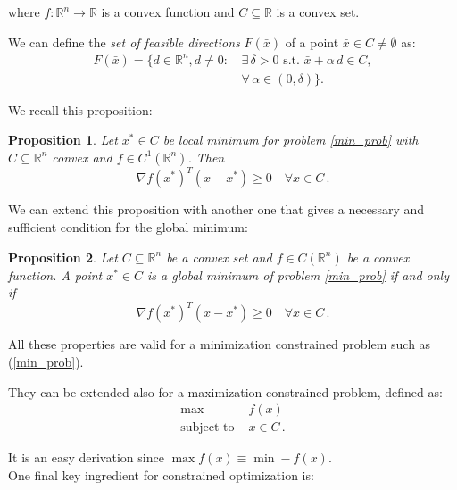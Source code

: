 \documentclass[10pt,twocolumn,letterpaper, english]{article}
\theoremstyle{definition}
\theoremstyle{plain}
\theoremstyle{plain}
\theoremstyle{plain}
\theoremstyle{plain}
\newtheorem{prop}{Proposition}[subsection]
\theoremstyle{remark}
\theoremstyle{remark}
\theoremstyle{definition}
\theoremstyle{definition}
\theoremstyle{definition}
\theoremstyle{definition}
\begin{document}
\noindent where $f: \mathbb{R}^n \to \mathbb{R}$ is a convex function and $C \subseteq \mathbb{R}$ is a convex set.

We can define the \textit{set of feasible directions} $F(\bar{x})$ of a point $\bar{x} \in C \ne \emptyset$ as: 
\begin{align}
    F(\bar{x}) = \{ d \in \mathbb{R}^n, d \ne 0:\, &\exists \, \delta > 0 \text{ s.t. } \bar{x} + \alpha\, d \in C, \\ &\forall\, \alpha \in (0, \delta) \} . \nonumber
\end{align}

\noindent We recall this proposition: 

\begin{prop}
 Let $x^* \in C$ be local minimum for problem \ref{min_prob} with $C \subseteq \mathbb{R}^n$ convex and $f \in C^1(\mathbb{R}^n)$. Then 
\begin{equation}
    \label{ineq}
    \nabla f(x^*)^T (x - x^*) \ge 0 \quad \forall x \in C \,. 
\end{equation}

\end{prop}


We can extend this proposition with another one that gives a necessary and sufficient condition for the global minimum: 

\begin{prop}
Let $C \subseteq \mathbb{R}^n$ be a convex set and $f \in C(\mathbb{R}^n)$ be a convex function. A point $x^* \in C$ is a \textit{global minimum} of problem \ref{min_prob} if and only if 
\begin{equation*}
    \nabla f(x^*)^T (x - x^*) \ge 0 \quad \forall x \in C \,. 
\end{equation*}
\end{prop}

All these properties are valid for a minimization constrained problem such as (\ref{min_prob}). 

They can be extended also for a maximization constrained problem, defined as: 
\begin{align*}
    \max\, &f(x) \\
    \text{subject to } &x \in C \,.
\end{align*}

It is an easy derivation since $\max f(x) \equiv \min -f(x)$. \\

One final key ingredient for constrained optimization is:\\
\end{document}
